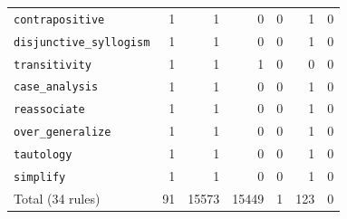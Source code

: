 {\begin{tabular}{@{}l r r r r r r@{}}
\texttt{contrapositive} & 1 & 1 & 0 & 0 & 1 & 0 \\
\texttt{disjunctive\_syllogism} & 1 & 1 & 0 & 0 & 1 & 0 \\
\texttt{transitivity} & 1 & 1 & 1 & 0 & 0 & 0 \\
\texttt{case\_analysis} & 1 & 1 & 0 & 0 & 1 & 0 \\
\texttt{reassociate} & 1 & 1 & 0 & 0 & 1 & 0 \\
\texttt{over\_generalize} & 1 & 1 & 0 & 0 & 1 & 0 \\
\texttt{tautology} & 1 & 1 & 0 & 0 & 1 & 0 \\
\texttt{simplify} & 1 & 1 & 0 & 0 & 1 & 0 \\
\midrule
Total (34 rules) & 91 & 15573 & 15449 & 1 & 123 & 0 \\
\bottomrule
\end{tabular}}
